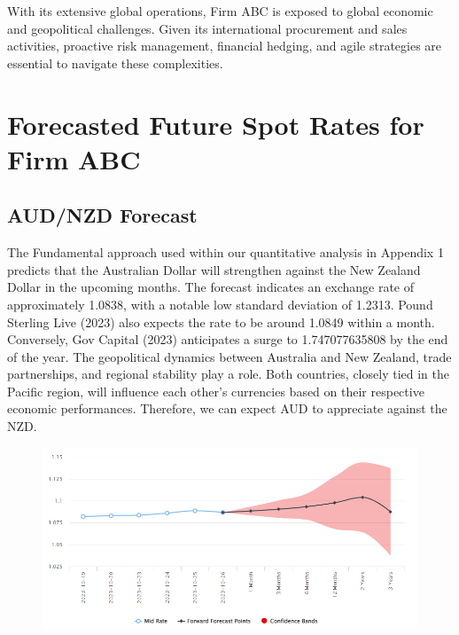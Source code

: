 \documentclass{article}
\let\Oldsubsection\subsection
\renewcommand{\subsection}{\FloatBarrier\Oldsubsection}
\begin{document}
\noindent With its extensive global operations, Firm ABC is exposed to global economic and geopolitical challenges. Given its international procurement and sales activities, proactive risk management, financial hedging, and agile strategies are essential to navigate these complexities.\\

\section*{Forecasted Future Spot Rates for Firm ABC}

\subsection*{AUD/NZD Forecast}

\noindent The Fundamental approach used within our quantitative analysis in Appendix 1 predicts that the Australian Dollar will strengthen against the New Zealand Dollar in the upcoming months. The forecast indicates an exchange rate of approximately 1.0838, with a notable low standard deviation of 1.2313. Pound Sterling Live (2023) also expects the rate to be around 1.0849 within a month. Conversely, Gov Capital (2023) anticipates a surge to 1.747077635808 by the end of the year. The geopolitical dynamics between Australia and New Zealand, trade partnerships, and regional stability play a role. Both countries, closely tied in the Pacific region, will influence each other's currencies based on their respective economic performances. Therefore, we can expect AUD to appreciate against the NZD.\\

\begin{figure}[h!]
    \centering
    \includegraphics[scale=0.5]{graphs/AUDNZD.png}
\end{figure}
\end{document}
